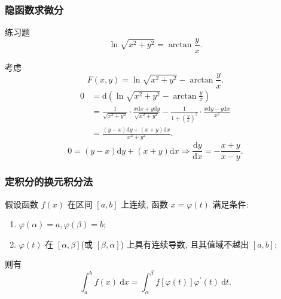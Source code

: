 \documentclass[
10pt,
aspectratio=43,
]{beamer}
\begin{document}
\begin{frame}
	\frametitle{隐函数求微分}
	\everymath{\displaystyle}
	\begin{block}{练习题}
		$$
			\ln \sqrt{x^2+y^2}=\arctan \frac{y}{x}.
		$$
	\end{block}
	\pause
	\vspace{0.3cm}
	\begin{exampleblock}{}
		考虑
		$$
			F(x,y)= \ln \sqrt{x^2+y^2}-\arctan \frac{y}{x}.
		$$
		\pause
		$$
			\begin{aligned}
				0 & =\mathrm{d}\left(\ln \sqrt{x^2+y^2}-\arctan \frac{y}{x}\right)                                                                                                    \\
				  & =\frac{1}{{\sqrt{x^2+y^2}}}\cdot\frac{x\mathrm{d}x+y\mathrm{d}y}{\sqrt{x^2+y^2}}-\frac{1}{1+\left(\frac{y}{x}\right)^2}\cdot\frac{x\mathrm{d}y-y\mathrm{d}x}{x^2} \\
				  & =\frac{(y-x)\mathrm{d}y+(x+y)\mathrm{d}x}{x^2+y^2}.
			\end{aligned}
		$$
		\pause
		$$
			0=(y-x)\mathrm{d}y+(x+y)\mathrm{d}x\Rightarrow\frac{\mathrm{d}y}{\mathrm{d}x}=-\frac{x+y}{x-y}.
		$$
	\end{exampleblock}
\end{frame}
\begin{frame}
	\frametitle{定积分的换元积分法}
	\everymath{\displaystyle}
	\begin{theorem}[定积分的换元积分法]
		假设函数 $f(x)$ 在区间 $[a,b]$ 上连续, 函数 $x=\varphi(t)$ 满足条件:
		\begin{enumerate}
			\item $\varphi(\alpha)=a, \varphi(\beta)=b$;
			\item $\varphi(t)$ 在 $[\alpha, \beta]$(或 $[\beta, \alpha]$) 上具有连续导数, 且其值域不越出 $[a, b]$;
		\end{enumerate}
		则有
		$$
			\int_a^b f(x) \mathrm{~d} x=\int_\alpha^\beta f\left[\varphi(t)\right] \varphi^{\prime}(t) \mathrm{~d} t .
		$$
	\end{theorem}
\end{frame}
\end{document}
